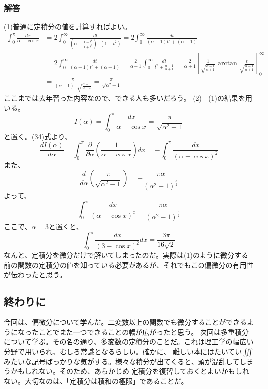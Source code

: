 \documentclass[a4j,dvipdfmx]{jsarticle}
\begin{document}
\subsubsection*{解答}
(1)普通に定積分の値を計算すればよい。
\begin{align*}
    \int_0^\pi\frac{dx}{\alpha-\cos x}&=2\int_0^\infty\frac{dt}{(\alpha-\frac{1-t^2}{1+t^2})\cdot(1+t^2)}=2\int_0^\infty\frac{dt}{(\alpha+1)t^2+(\alpha-1)}\\
    &=2\int_0^\infty\frac{dt}{(\alpha+1)t^2+(\alpha-1)}=\frac{2}{\alpha+1}\int_0^\infty\frac{dt}{t^2+\frac{\alpha-1}{\alpha+1}}=\frac{2}{\alpha+1}\left[\frac{1}{\sqrt{\frac{\alpha-1}{\alpha+1}}}\arctan \frac{t}{\sqrt{\frac{\alpha-1}{\alpha+1}}}\right]_0^\infty\\
    &=\frac{\pi}{(\alpha+1)\cdot\sqrt{\frac{\alpha-1}{\alpha+1}}}=\frac{\pi}{\sqrt{\alpha^2-1}}
\end{align*}
ここまでは去年習った内容なので、できる人も多いだろう。
(2)　(1)の結果を用いる。
\begin{equation*}
    I(\alpha)=\int_0^\pi\frac{dx}{\alpha-\cos x}=\frac{\pi}{\sqrt{\alpha^2-1}}
\end{equation*}
と置く。(34)式より、
\begin{equation*}
    \frac{dI(\alpha)}{d\alpha}=\int_0^\pi\frac{\partial}{\partial \alpha}\left(\frac{1}{\alpha-\cos x}\right)dx=-\int_0^\pi\frac{dx}{(\alpha-\cos x)^2}
\end{equation*}
また、
\begin{equation*}
    \frac{d}{d\alpha}\left(\frac{\pi}{\sqrt{\alpha^2-1}}\right)=-\frac{\pi\alpha}{(\alpha^2-1)^{\frac{3}{2}}}
\end{equation*}
よって、
\begin{equation*}
    \int_0^\pi\frac{dx}{(\alpha-\cos x)^2}=\frac{\pi\alpha}{(\alpha^2-1)^{\frac{3}{2}}}
\end{equation*}
ここで、$\alpha=3$と置くと、
\begin{equation*}
    \int_0^\pi\frac{dx}{(3-\cos x)^2}dx=\frac{3\pi}{16\sqrt{2}}
\end{equation*}
なんと、定積分を微分だけで解いてしまったのだ。実際は(1)のように微分する前の関数の定積分の値を知っている必要があるが、それでもこの偏微分の有用性が伝わったと思う。

\subsection{終わりに}
今回は、偏微分について学んだ。二変数以上の関数でも微分することができるようになったことでまた一つできることの幅が広がったと思う。
次回は多重積分について学ぶ。その名の通り、多変数の定積分のことだ。これは理工学の幅広い分野で用いられ、むしろ常識となるらしい。確かに、
難しい本にはたいてい$\iiint$みたいな記号ばっかりな気がする。様々な積分が出てくると、頭が混乱してしまうかもしれない。そのため、あらかじめ
定積分を復習しておくとよいかもしれない。大切なのは、「定積分は積和の極限」であることだ。
\end{document}
